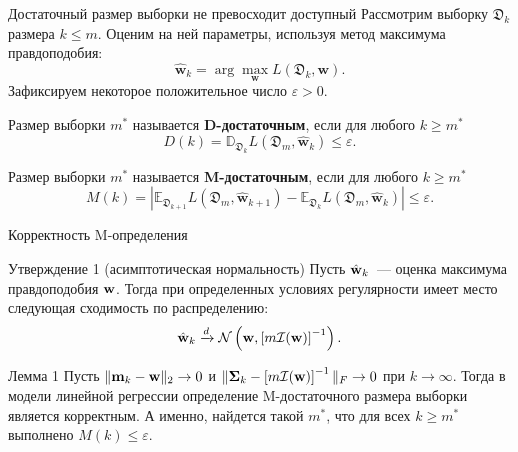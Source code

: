 \documentclass{beamer}
\begin{document}
\begin{frame}{Достаточный размер выборки не превосходит доступный}
    Рассмотрим выборку $\mathfrak{D}_k$ размера $k \leqslant m$. Оценим на ней параметры, используя метод максимума правдоподобия:
    \[ \hat{\mathbf{w}}_{k} = \arg\max_{\mathbf{w}} L(\mathfrak{D}_k, \mathbf{w}). \]
    Зафиксируем некоторое положительное число $\varepsilon > 0$.
    \begin{rusdefinition}
        Размер выборки $m^*$ называется \textbf{D-достаточным}, если для любого $k \geqslant m^*$
        \[ D(k) = \mathbb{D}_{\mathfrak{D}_k} L(\mathfrak{D}_m, \hat{\mathbf{w}}_{k}) \leqslant \varepsilon. \]
    \end{rusdefinition}
    \begin{rusdefinition}
        Размер выборки $m^*$ называется \textbf{M-достаточным}, если для любого $k \geqslant m^*$ 
        \[ M(k) = \left| \mathbb{E}_{\mathfrak{D}_{k+1}} L(\mathfrak{D}_m, \hat{\mathbf{w}}_{k+1}) - \mathbb{E}_{\mathfrak{D}_k} L(\mathfrak{D}_m, \hat{\mathbf{w}}_{k}) \right| \leqslant \varepsilon. \]
    \end{rusdefinition}
\end{frame}
\begin{frame}{Корректность M-определения}
    \begin{block}{Утверждение 1 (асимптотическая нормальность)}
        Пусть $\hat{\mathbf{w}}_k$~--- оценка максимума правдоподобия $\mathbf{w}$. Тогда при определенных условиях регулярности имеет место следующая сходимость по распределению:
        \[ \hat{\mathbf{w}}_k \xrightarrow{d} \mathcal{N}\left(\mathbf{w}, \left[m\mathcal{I}(\mathbf{w})\right]^{-1}\right). \]
    \end{block}
    \begin{alertblock}{Лемма 1}
        Пусть $\| \mathbf{m}_k - \mathbf{w} \|_2 \to 0$ и $\| \boldsymbol{\Sigma}_k - \left[m\mathcal{I}(\mathbf{w})\right]^{-1} \|_{F} \to 0$ при $k \to \infty$. Тогда в модели линейной регрессии определение M-достаточного размера выборки является корректным. А именно, найдется такой $m^*$, что для всех $k \geqslant m^*$ выполнено $M(k) \leqslant \varepsilon$.
    \end{alertblock}
\end{frame}
\end{document}
